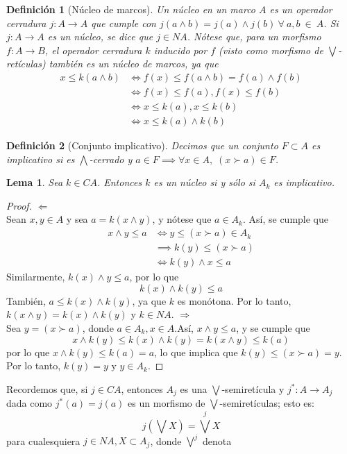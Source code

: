 \documentclass[12pt,letterpaper,titlepage]{article}
\newtheorem*{defn}{Definición}
\newtheorem{lemma}{Lema}
\theoremstyle{definition}
\newcommand\Sup{\bigvee}
\renewcommand\inf{\wedge}
\newcommand\Inf{\bigwedge}
\newcommand\<{\langle}
\renewcommand\>{\rangle}
\begin{document}
\begin{defn}[Núcleo de marcos]
Un núcleo en un marco $A$ es un operador cerradura $j:A \to A$ que cumple con $j(a\wedge b)=j(a)\wedge j(b) \ \forall \ a,b \ \in \ A$.
Si $j:A\to A$ es un núcleo, se dice que $j\in NA$.
Nótese que, para un morfismo $f: A\to B$, el operador cerradura $k$
inducido por $f$ (visto como morfismo de $\Sup$-retículas)
también es un núcleo de marcos, ya que
\begin{align*}
x\leq k(a\wedge b)&\iff f(x)\leq f(a\wedge b)=f(a)\wedge f(b)\\
&\iff f(x)\leq f(a) , f(x)\leq f(b) \\
&\iff x\leq k(a), x\leq k(b)\\
& \iff x\leq k(a)\wedge k(b)
\end{align*}
\end{defn}
\begin{defn}[Conjunto implicativo]
Decimos que un conjunto $F\subset A$ es implicativo
si es $\Inf$-cerrado y
$a\in F \implies  \forall x \in A,\; (x\succ a)\in F$.
\end{defn}
\begin{lemma}
Sea $k\in CA$.
Entonces $k$ es un núcleo si  y sólo si $A_k$ es implicativo.
\end{lemma}
\begin{proof}
$\Leftarrow$\\
Sean $x,y \in A$ y sea $a=k(x\inf y)$, y nótese que $a\in A_k$. Así, se cumple que 
\begin{align*}
    x\inf y\leq a
    & \iff y\leq (x\succ a)\in A_k\\
    &\implies k(y)\leq (x\succ a)\\
    &\iff k(y)\inf x\leq a
\end{align*}
Similarmente, $k(x)\inf y\leq a$, por lo que 
$$ k(x)\inf k(y)\leq a$$
También, $a\leq k(x)\inf k(y)$, ya que $k$ es monótona.
Por lo tanto, $k(x\inf y)=k(x)\inf k(y)$ y $k\in NA$.
\vspace{5mm}
$\Rightarrow$\\
Sea $y=(x\succ a)$, donde $a\in A_k, x\in A$.Así, $x\inf y\leq a$, y se cumple que 
$$x\inf k(y)\leq k(x)\inf k(y) =k(x\inf y)\leq k(a)$$
por lo que $x\inf k(y)\leq k(a)=a$, lo que implica que $k(y)\leq (x\succ a)=y$. Por lo tanto, $k(y)=y$ y $y\in A_k$.
\end{proof}
Recordemos que, si $j\in CA$, entonces $A_j$ es una $\Sup$-semiretícula
y $j^*:A\to A_j$ dada como $j^*(a)=j(a)$
es un morfismo de $\Sup$-semiretículas; esto es:
$$j(\Sup X)=\Sup^jX$$
para cualesquiera $j\in NA, X\subset A_j$, donde $\Sup^j$ denota
\end{document}
